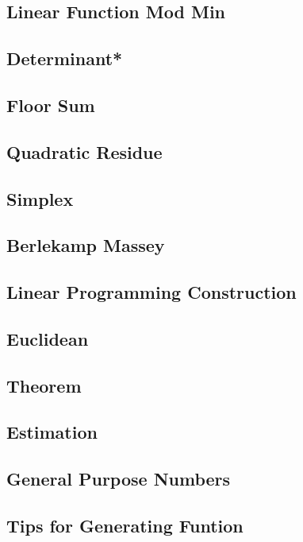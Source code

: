 \subsection{Linear Function Mod Min} 
\subsection{Determinant*}
\subsection{Floor Sum}
\subsection{Quadratic Residue}
\subsection{Simplex}
\subsection{Berlekamp Massey}
\subsection{Linear Programming Construction}

\subsection{Euclidean}

\subsection{Theorem}

\subsection{Estimation}

\subsection{General Purpose Numbers}

\subsection{Tips for Generating Funtion}


